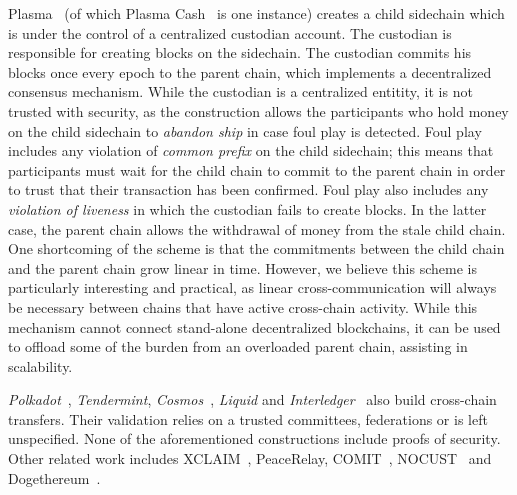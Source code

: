 Plasma~\cite{plasma} (of which Plasma Cash~\cite{plasmacash} is one instance)
creates a child sidechain which is under the control of a centralized custodian
account. The custodian is responsible for creating blocks on the sidechain. The
custodian commits his blocks once every epoch to the parent chain, which
implements a decentralized consensus mechanism. While the custodian is a
centralized entitity, it is not trusted with security, as the construction
allows the participants who hold money on the child sidechain to \emph{abandon
ship} in case foul play is detected. Foul play includes any violation of
\emph{common prefix} on the child sidechain; this means that participants must
wait for the child chain to commit to the parent chain in order to trust that
their transaction has been confirmed. Foul play also includes any
\emph{violation of liveness} in which the custodian fails to create blocks. In
the latter case, the parent chain allows the withdrawal of money from the stale
child chain. One shortcoming of the scheme is that the commitments between the
child chain and the parent chain grow linear in time. However, we believe this
scheme is particularly interesting and practical, as linear cross-communication
will always be necessary between chains that have active cross-chain activity.
While this mechanism cannot connect stand-alone decentralized blockchains, it
can be used to offload some of the burden from an overloaded parent chain,
assisting in scalability.

\emph{Polkadot}~\cite{polkadot}, \emph{Tendermint},
\emph{Cosmos}~\cite{tendermint}, \emph{Liquid} and
\emph{Interledger}~\cite{interledger} also build cross-chain transfers. Their
validation relies on a trusted committees, federations or is left unspecified.
None of the aforementioned constructions include proofs of security. Other
related work includes XCLAIM~\cite{xclaim}, PeaceRelay, COMIT~\cite{comit},
NOCUST~\cite{nocust} and Dogethereum~\cite{dogethereum}.

